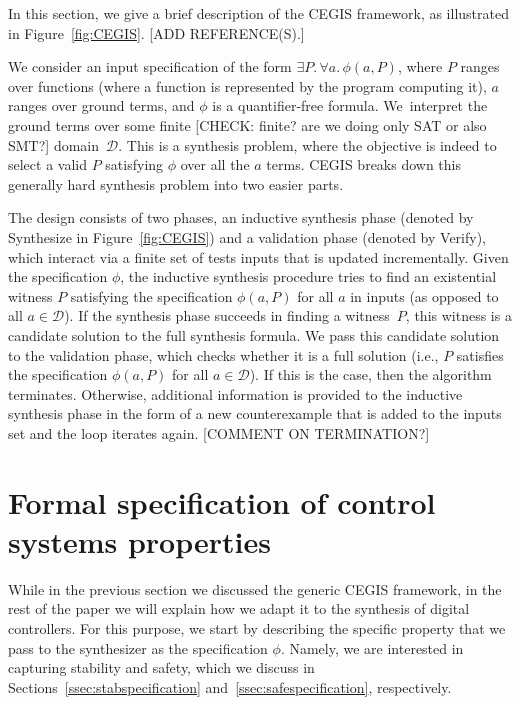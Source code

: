 \documentclass[twocolumn]{autart}    %
\begin{document}
In this section, we give a brief description of the CEGIS framework, as illustrated in Figure~\ref{fig:CEGIS}. [ADD REFERENCE(S).]

We consider an input specification of the form $\exists P .\, \forall a.\, \phi(a, P)$, 
where $P$ ranges over functions (where a function is represented by the program computing it),
$a$ ranges over ground terms, 
and $\phi$ is a quantifier-free formula. 
We~interpret the ground terms over some finite [CHECK: finite? are we doing only SAT or also SMT?] domain~$\mathcal{D}$. 
This is a synthesis problem, where the objective is indeed to select a valid $P$ satisfying $\phi$ over all the $a$ terms. 
CEGIS breaks down this generally hard synthesis problem into two easier parts. 

The design consists of two phases, an inductive synthesis phase (denoted by {\sc Synthesize} in
Figure~\ref{fig:CEGIS}) and a validation phase (denoted by {\sc
  Verify}), which interact via a finite set of tests {\sc
  inputs} that is updated incrementally.  Given the specification $\phi$, the inductive synthesis procedure tries to
find an existential witness $P$ satisfying the specification
$\phi(a, P)$ for all $a$ in {\sc inputs} (as opposed to all $a \in
\mathcal{D}$).
%
If the synthesis phase succeeds in finding a witness~$P$, this witness is a
candidate solution to the full synthesis formula.  We pass this candidate
solution to the validation phase, which checks whether it is a full solution
(i.e., $P$ satisfies the specification $\phi(a, P)$ for all
$a\in\mathcal{D}$).  If this is the case, then the algorithm terminates. 
Otherwise, additional information is provided to the inductive synthesis
phase in the form of a new counterexample that is added to the {\sc inputs}
set and the loop iterates again.  %
[COMMENT ON TERMINATION?]

\section{Formal specification of control systems properties} 
\label{sec:specification}

While in the previous section we discussed the generic CEGIS
framework, in the rest of the paper we will explain how we adapt it to
the synthesis of digital controllers. For this purpose, we start by
describing the specific property that we pass to the synthesizer as
the specification $\phi$. Namely, we are interested in capturing
stability and safety, which we discuss in Sections~\ref{ssec:stabspecification}
and~\ref{ssec:safespecification}, respectively.
\end{document}
